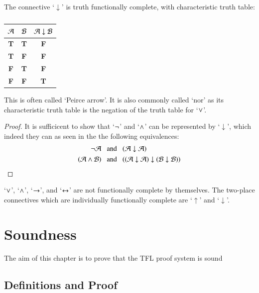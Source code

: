 \documentclass[12pt, a4paper, oneside, openright, titlepage]{book}
\begin{document}
\begin{defn}
    The connective `$\downarrow$' is truth functionally complete, with characteristic truth table: 
        \begin{table}[H]
            \centering
            \caption{}
            \begin{tabular}{cc|c}
                $\mathcal{A}$ & $\mathcal{B}$ & $\mathcal{A} \downarrow \mathcal{B}$\\ \hline
                \textbf{T} & \textbf{T} & \textbf{F} \\
                \textbf{T} & \textbf{F} & \textbf{F} \\
                \textbf{F} & \textbf{T} & \textbf{F} \\
                \textbf{F} & \textbf{F} & \textbf{T}
            \end{tabular}
        \end{table}
        This is often called `Peirce arrow'. It is also commonly called `nor' as its characteristic truth table is the negation of the truth table for `$\vee$'.
\end{defn}
\begin{proof}
    It is sufficicent to show that `$\neg$' and `$\wedge$' can be represented by `$\downarrow$', which indeed they can as seen in the the following equivalences: 
    \begin{align*}
        \neg\mathcal{A}\;\;&\text{ and }\;\;(\mathcal{A}\downarrow \mathcal{A}) \\
        (\mathcal{A}\wedge\mathcal{B})\;\;&\text{ and }\;\;((\mathcal{A}\downarrow\mathcal{A})\downarrow(\mathcal{B}\downarrow\mathcal{B}))
    \end{align*}
\end{proof}


\begin{thm}
    `$\vee$', `$\wedge$', `$\rightarrow$', and `$\leftrightarrow$' are not functionally complete by themselves. The  two-place connectives which are individually functionally complete are `$\uparrow$' and `$\downarrow$'.
\end{thm}



\chapter{\textsection\textsection Soundness}

The aim of this chapter is to prove that the TFL proof system is sound

\section{\textsection Definitions and Proof}
\end{document}
